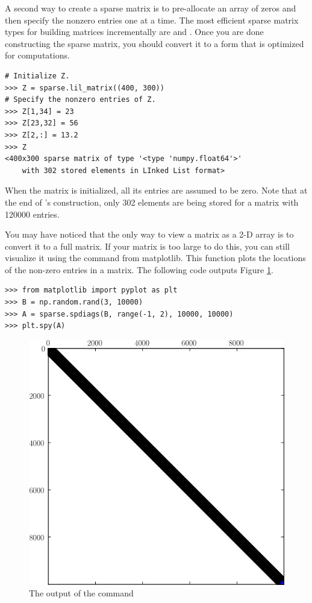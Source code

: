A second way to create a sparse matrix is to pre-allocate an array of zeros and then specify the nonzero entries one at a time. 
The most efficient sparse matrix types for building matrices incrementally are  and . 
Once you are done constructing the sparse matrix, you should convert it to a form that is optimized for computations.


\begin{lstlisting}
# Initialize Z.
>>> Z = sparse.lil_matrix((400, 300))
# Specify the nonzero entries of Z.
>>> Z[1,34] = 23
>>> Z[23,32] = 56
>>> Z[2,:] = 13.2
>>> Z
<400x300 sparse matrix of type '<type 'numpy.float64'>'
	with 302 stored elements in LInked List format>

\end{lstlisting}

When the matrix  is initialized, all its entries are assumed to be zero. 
Note that at the end of 's construction, only 302 elements are being stored for a matrix with 120000 entries. 

You may have noticed that the only way to view a matrix as a 2-D array is to convert it to a full matrix. 
If your matrix is too large to do this, you can still visualize it using the  command from matplotlib. 
This function plots the locations of the non-zero entries in a matrix. 
The following code outputs Figure \ref{fig:mpl_spy}.

\begin{lstlisting}
>>> from matplotlib import pyplot as plt
>>> B = np.random.rand(3, 10000)
>>> A = sparse.spdiags(B, range(-1, 2), 10000, 10000)
>>> plt.spy(A)
\end{lstlisting}

\begin{figure}
\centering
\includegraphics[width=.75\textwidth]{spy.png}
\caption{The output of the  command}
\label{fig:mpl_spy}
\end{figure}



